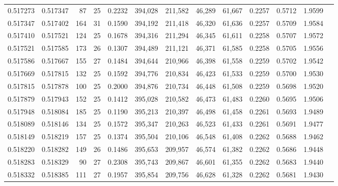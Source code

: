 \begin{tabular}{rrrrrrrrrrrrr}
0.517273 & 0.517347 &  87 &  25 &                                     0.2232 & 394,028 & 211,582 &  46,289 &  61,667 & 0.2257 & 0.5712 & 1.9599 \\
0.517347 & 0.517402 & 164 &  31 &                                     0.1590 & 394,192 & 211,418 &  46,320 &  61,636 & 0.2257 & 0.5709 & 1.9584 \\
0.517410 & 0.517521 & 124 &  25 &                                     0.1678 & 394,316 & 211,294 &  46,345 &  61,611 & 0.2258 & 0.5707 & 1.9572 \\
0.517521 & 0.517585 & 173 &  26 &                                     0.1307 & 394,489 & 211,121 &  46,371 &  61,585 & 0.2258 & 0.5705 & 1.9556 \\
0.517586 & 0.517667 & 155 &  27 &                                     0.1484 & 394,644 & 210,966 &  46,398 &  61,558 & 0.2259 & 0.5702 & 1.9542 \\
0.517669 & 0.517815 & 132 &  25 &                                     0.1592 & 394,776 & 210,834 &  46,423 &  61,533 & 0.2259 & 0.5700 & 1.9530 \\
0.517815 & 0.517878 & 100 &  25 &                                     0.2000 & 394,876 & 210,734 &  46,448 &  61,508 & 0.2259 & 0.5698 & 1.9520 \\
0.517879 & 0.517943 & 152 &  25 &                                     0.1412 & 395,028 & 210,582 &  46,473 &  61,483 & 0.2260 & 0.5695 & 1.9506 \\
0.517948 & 0.518084 & 185 &  25 &                                     0.1190 & 395,213 & 210,397 &  46,498 &  61,458 & 0.2261 & 0.5693 & 1.9489 \\
0.518089 & 0.518146 & 134 &  25 &                                     0.1572 & 395,347 & 210,263 &  46,523 &  61,433 & 0.2261 & 0.5691 & 1.9477 \\
0.518149 & 0.518219 & 157 &  25 &                                     0.1374 & 395,504 & 210,106 &  46,548 &  61,408 & 0.2262 & 0.5688 & 1.9462 \\
0.518220 & 0.518282 & 149 &  26 &                                     0.1486 & 395,653 & 209,957 &  46,574 &  61,382 & 0.2262 & 0.5686 & 1.9448 \\
0.518283 & 0.518329 &  90 &  27 &                                     0.2308 & 395,743 & 209,867 &  46,601 &  61,355 & 0.2262 & 0.5683 & 1.9440 \\
0.518332 & 0.518385 & 111 &  27 &                                     0.1957 & 395,854 & 209,756 &  46,628 &  61,328 & 0.2262 & 0.5681 & 1.9430 \\

\end{tabular}
